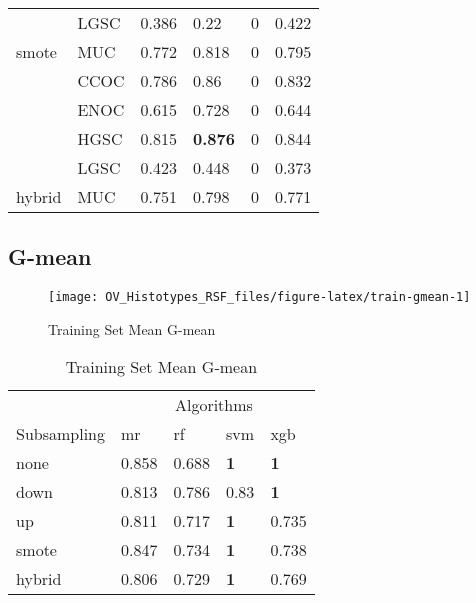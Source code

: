 \documentclass[
]{report}
\begin{document}
\begin{table}
\begin{tabular}[t]{l|l|l|l|l|l}
\cline{2-6}
 & LGSC & 0.386 & 0.22 & 0 & 0.422\\
\cline{2-6}
\multirow{-5}{*}{\raggedright\arraybackslash smote} & MUC & 0.772 & 0.818 & 0 & 0.795\\
\cline{1-6}
 & CCOC & 0.786 & 0.86 & 0 & 0.832\\
\cline{2-6}
 & ENOC & 0.615 & 0.728 & 0 & 0.644\\
\cline{2-6}
 & HGSC & 0.815 & \textbf{0.876} & 0 & 0.844\\
\cline{2-6}
 & LGSC & 0.423 & 0.448 & 0 & 0.373\\
\cline{2-6}
\multirow{-5}{*}{\raggedright\arraybackslash hybrid} & MUC & 0.751 & 0.798 & 0 & 0.771\\
\hline
\end{tabular}
\end{table}

\hypertarget{g-mean}{%
\subsection{G-mean}\label{g-mean}}

\begin{figure}[H]

{\centering \texttt{[image: OV\_Histotypes\_RSF\_files/figure-latex/train-gmean-1]} 

}

\caption{Training Set Mean G-mean}\label{fig:train-gmean}
\end{figure}

\begin{table}

\caption{\label{tab:train-gmean-table}Training Set Mean G-mean}
\centering
\begin{tabular}[t]{l|l|l|l|l}
\hline
\multicolumn{1}{c|}{ } & \multicolumn{4}{c}{Algorithms} \\
\cline{2-5}
Subsampling & mr & rf & svm & xgb\\
\hline
none & 0.858 & 0.688 & \textbf{1} & \textbf{1}\\
\hline
down & 0.813 & 0.786 & 0.83 & \textbf{1}\\
\hline
up & 0.811 & 0.717 & \textbf{1} & 0.735\\
\hline
smote & 0.847 & 0.734 & \textbf{1} & 0.738\\
\hline
hybrid & 0.806 & 0.729 & \textbf{1} & 0.769\\
\hline
\end{tabular}
\end{table}
\end{document}
